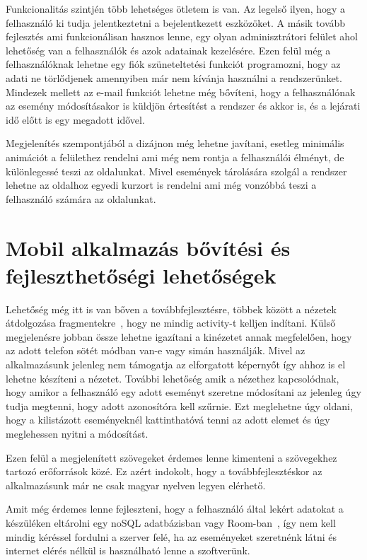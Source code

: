 \documentclass[
]{thesis-ekf}
\theoremstyle{definition}
\theoremstyle{remark}
\begin{document}
	Funkcionalitás szintjén több lehetséges ötletem is van. Az legelső ilyen, hogy a felhasználó ki tudja jelentkeztetni a bejelentkezett eszközöket. A másik tovább fejlesztés ami funkcionálisan hasznos lenne, egy olyan adminisztrátori felület ahol lehetőség van a felhasználók és azok adatainak kezelésére. Ezen felül még a felhasználóknak lehetne egy fiók szüneteltetési funkciót programozni, hogy az adati ne törlődjenek amennyiben már nem kívánja használni a rendszerünket. Mindezek mellett az e-mail funkciót lehetne még bővíteni, hogy a felhasználónak az esemény módosításakor is küldjön értesítést a rendszer és akkor is, és a lejárati idő előtt is egy megadott idővel.
	
	Megjelenítés szempontjából a dizájnon még lehetne javítani, esetleg minimális animációt a felülethez rendelni ami még nem rontja a felhasználói élményt, de különlegessé teszi az oldalunkat. Mivel események tárolására szolgál a rendszer lehetne az oldalhoz egyedi kurzort is rendelni ami még vonzóbbá teszi a felhasználó számára az oldalunkat. 
	
	
	\section{Mobil alkalmazás bővítési és fejleszthetőségi lehetőségek}
	Lehetőség még itt is van bőven a továbbfejlesztésre, többek között a nézetek átdolgozása fragmentekre~\cite{android_fragment}, hogy ne mindig activity-t kelljen indítani. Külső megjelenésre jobban össze lehetne igazítani a kinézetet annak megfelelően, hogy az adott telefon sötét módban van-e vagy simán használják. Mivel az alkalmazásunk jelenleg nem támogatja az elforgatott képernyőt így ahhoz is el lehetne készíteni a nézetet. További lehetőség amik a nézethez kapcsolódnak, hogy amikor a felhasználó egy adott eseményt szeretne módosítani az jelenleg úgy tudja megtenni, hogy adott azonosítóra kell szűrnie. Ezt meglehetne úgy oldani, hogy a kilistázott eseményeknél kattinthatóvá tenni az adott elemet és úgy meglehessen nyitni a módosítást. 
	
	Ezen felül a megjelenített szövegeket érdemes lenne kimenteni a szövegekhez tartozó erőforrások közé. Ez azért indokolt, hogy a továbbfejlesztéskor az alkalmazásunk már ne csak magyar nyelven legyen elérhető. 
	
	Amit még érdemes lenne fejleszteni, hogy a felhasználó által lekért adatokat a készüléken eltárolni egy noSQL adatbázisban vagy Room-ban~\cite{android_room}, így nem kell mindig kéréssel fordulni a szerver felé, ha az eseményeket szeretnénk látni és internet elérés nélkül is használható lenne a szoftverünk. 
	
\end{document}
